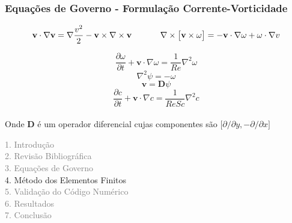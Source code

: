 \begin{frame} 
 \frametitle{\normalsize Equações de Governo - Formulação Corrente-Vorticidade}
\vspace{-1cm}
\scriptsize
\begin{equation*}
 \textbf{v} \cdot \nabla \textbf{v}
 = 
 \nabla \frac{v^{2}}{2}
 - 
 \textbf{v} \times \nabla \times \textbf{v}
 \hspace{1.2cm}
 \nabla \times \big[ \textbf{v} \times \omega \big]
 =
 -
 \textbf{v} \cdot \nabla \omega
 +
 \omega \cdot \nabla v
\end{equation*}

\small
\vspace{0.5cm}
\begin{equation*}
 \frac{\partial \omega}{\partial t} + \textbf{v} \cdot \nabla \omega = \frac{1}{Re} \nabla^{2} \omega
\end{equation*}
\vspace{0.2cm}
\begin{equation*}
\nabla^{2} \psi = - \omega
\end{equation*}
\vspace{0.2cm}
\begin{equation*}
\textbf{v} = \textbf{D} \psi
\end{equation*}
\vspace{0.2cm}
\begin{equation*}
\frac{\partial c}{\partial t} + \textbf{v} \cdot \nabla c = \frac{1}{ReSc} \nabla^{2} c
\end{equation*}\\[0.5cm]
Onde \textbf{D} é um operador diferencial
cujas componentes são $\big[\partial / \partial y,- \partial / \partial x \big]$
\end{frame}


\begin{frame}
  \vspace{-1cm}
  \textcolor{gray}{1. Introdução}\\[0.1cm]
  \textcolor{gray}{2. Revisão Bibliográfica}\\[0.1cm]
  \textcolor{gray}{3. Equações de Governo}\\[0.1cm]
  4. Método dos Elementos Finitos\\[0.1cm]
  \textcolor{gray}{5. Validação do Código Numérico}\\[0.1cm]
  \textcolor{gray}{6. Resultados}\\[0.1cm]
  \textcolor{gray}{7. Conclusão}
\end{frame}


